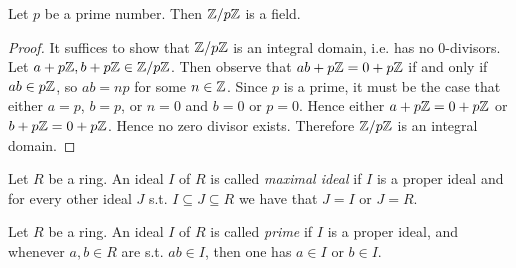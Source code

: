 \begin{corollary}
  Let $p$ be a prime number. Then $\mathbb Z/p\mathbb Z$ is a field.
  \label{<+label+>}
\end{corollary}
\begin{proof}
  It suffices to show that $\mathbb Z/p\mathbb Z$ is an integral domain, i.e. has no $0$-divisors. Let
  $a+p\mathbb Z, b+p\mathbb Z\in \mathbb Z/p\mathbb Z$. Then observe that $ab+p\mathbb Z=0+p\mathbb Z$ if and only if $ab\in
  p\mathbb Z$, so $ab=np$ for some $n\in\mathbb Z$. Since $p$ is a prime, it must be the case that
  either $a=p$, $b=p$, or $n=0$ and $b=0$ or $p=0$. Hence either $a+p\mathbb Z = 0+p\mathbb Z$ or
  $b+p\mathbb Z=0+p\mathbb Z$. Hence no zero divisor exists. Therefore $\mathbb Z/p\mathbb Z$ is an integral
  domain.
\end{proof}

\begin{definition}
  Let $R$ be a ring. An ideal $I$ of $R$ is called \emph{maximal ideal} if $I$ is a proper
  ideal and for every other ideal $J$ s.t. $I\subseteq J \subseteq R$ we have that $J=I$
  or $J=R$.
  \label{def:maximalIdeal}
\end{definition}

\begin{definition}
  Let $R$ be a ring. An ideal $I$ of $R$ is called \emph{prime} if $I$ is a proper ideal,
  and whenever $a,b\in R$ are s.t. $ab\in I$, then one has $a\in I$ or $b\in I$.
  \label{<+label+>}
\end{definition}

